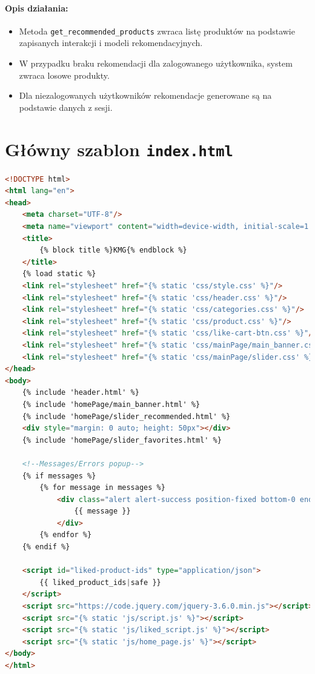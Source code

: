 \documentclass[12pt,a4paper,oneside]{article}
\theoremstyle{definition}
\numberwithin{equation}{section}
\begin{document}
\paragraph{Opis działania:}
\begin{itemize}
    \item Metoda \texttt{get\_recommended\_products} zwraca listę produktów na podstawie zapisanych interakcji i modeli rekomendacyjnych.
    \item W przypadku braku rekomendacji dla zalogowanego użytkownika, system zwraca losowe produkty.
    \item Dla niezalogowanych użytkowników rekomendacje generowane są na podstawie danych z sesji.
\end{itemize}

\section{Główny szablon \texttt{index.html}}

\begin{lstlisting}[language=HTML]
<!DOCTYPE html>
<html lang="en">
<head>
    <meta charset="UTF-8"/>
    <meta name="viewport" content="width=device-width, initial-scale=1.0 shrink-to-fit=no"/>
    <title>
        {% block title %}KMG{% endblock %}
    </title>
    {% load static %}
    <link rel="stylesheet" href="{% static 'css/style.css' %}"/>
    <link rel="stylesheet" href="{% static 'css/header.css' %}"/>
    <link rel="stylesheet" href="{% static 'css/categories.css' %}"/>
    <link rel="stylesheet" href="{% static 'css/product.css' %}"/>
    <link rel="stylesheet" href="{% static 'css/like-cart-btn.css' %}"/>
    <link rel="stylesheet" href="{% static 'css/mainPage/main_banner.css' %}"/>
    <link rel="stylesheet" href="{% static 'css/mainPage/slider.css' %}"/>
</head>
<body>
    {% include 'header.html' %}
    {% include 'homePage/main_banner.html' %}
    {% include 'homePage/slider_recommended.html' %}
    <div style="margin: 0 auto; height: 50px"></div>
    {% include 'homePage/slider_favorites.html' %}

    <!--Messages/Errors popup-->
    {% if messages %}
        {% for message in messages %}
            <div class="alert alert-success position-fixed bottom-0 end-0 m-3" id="messagePopUp">
                {{ message }}
            </div>
        {% endfor %}
    {% endif %}

    <script id="liked-product-ids" type="application/json">
        {{ liked_product_ids|safe }}
    </script>
    <script src="https://code.jquery.com/jquery-3.6.0.min.js"></script>
    <script src="{% static 'js/script.js' %}"></script>
    <script src="{% static 'js/liked_script.js' %}"></script>
    <script src="{% static 'js/home_page.js' %}"></script>
</body>
</html>
\end{lstlisting}
\end{document}
